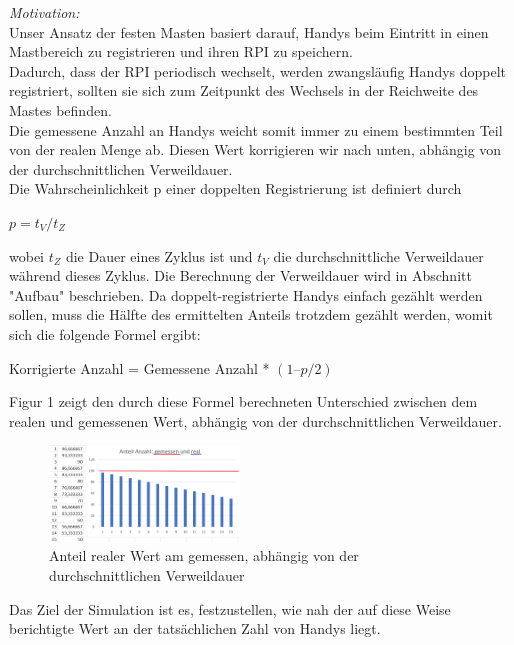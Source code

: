 \documentclass[conference]{IEEEtran}
\begin{document}
\textit{Motivation:} \\
Unser Ansatz der festen Masten basiert darauf, Handys beim Eintritt in einen Mastbereich zu registrieren und ihren RPI zu speichern.\\
Dadurch, dass der RPI periodisch wechselt, werden zwangsläufig Handys doppelt registriert, sollten sie sich zum Zeitpunkt des Wechsels in der Reichweite des Mastes befinden. \\
Die gemessene Anzahl an Handys weicht somit immer zu einem bestimmten Teil von der realen Menge ab. Diesen Wert korrigieren wir nach unten, abhängig von der durchschnittlichen Verweildauer.\\
Die Wahrscheinlichkeit p einer doppelten Registrierung ist definiert durch

\centerline{$p = t_V / t_Z$}

wobei $t_Z$ die Dauer eines Zyklus ist und $t_V$ die durchschnittliche Verweildauer während dieses Zyklus. Die Berechnung der Verweildauer wird in Abschnitt "Aufbau" beschrieben. Da doppelt-registrierte Handys einfach gezählt werden sollen, muss die Hälfte des ermittelten Anteils trotzdem gezählt werden, womit sich die folgende Formel ergibt:

\centerline{Korrigierte Anzahl = Gemessene Anzahl * $(1 – p/2)$}

Figur 1 zeigt den durch diese Formel berechneten Unterschied zwischen dem realen und gemessenen Wert, abhängig von der durchschnittlichen Verweildauer.

\begin{figure}[h]
	\centering
	\includegraphics[width=0.45\textwidth]{"Alte Formel Graph"}
	\caption{Anteil realer Wert am gemessen, abhängig von der durchschnittlichen Verweildauer}
\end{figure}

Das Ziel der Simulation ist es, festzustellen, wie nah der auf diese Weise berichtigte Wert an der tatsächlichen Zahl von Handys liegt.\\
\end{document}
